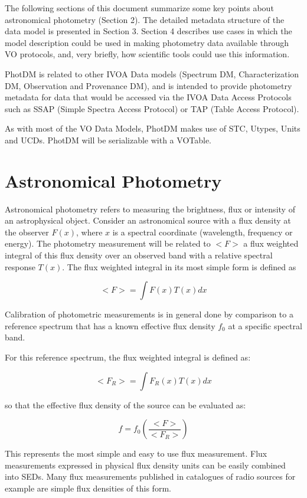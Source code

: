 \documentclass[11pt,a4paper]{ivoa}
\begin{document}
The following sections of this document summarize some key points about astronomical photometry (Section 2). The detailed metadata structure of the data model is presented in Section 3. Section 4 describes use cases in which the model description could be used in making photometry data available through VO protocols, and, very briefly, how scientific tools could use this information.


PhotDM is related to other IVOA Data models (Spectrum DM, Characterization DM, Observation and Provenance DM),  and is intended to provide photometry metadata for data that would be accessed via the IVOA Data Access Protocols such as SSAP (Simple Spectra Access Protocol) or TAP (Table Access Protocol).

As with most of the VO Data Models, PhotDM makes use of STC, Utypes, Units and UCDs. PhotDM will be serializable with a VOTable.

\section{Astronomical Photometry}
Astronomical photometry refers to measuring the brightness, flux or intensity of an astrophysical object. Consider an astronomical source with a flux density at the observer $F(x)$, where $x$ is a spectral coordinate (wavelength, frequency or energy).  The photometry measurement will be related to $<F>$ a flux weighted integral of this flux density over an observed band with a relative spectral response $T(x)$. The flux weighted integral in its most simple form is defined as


\[ <F> = \int F(x)T(x)dx \]

Calibration of photometric measurements is in general done by comparison to a reference spectrum that has a known effective flux density $f_0$ at a specific spectral band.


For this reference spectrum, the flux weighted integral is defined as:
\par
\[ <F_R > = \int F_R (x)T(x)dx \]

so that the effective flux density of the source can be evaluated as:\par

\[  f = f_0 ( \frac{<F>}{<F_R >} ) \]

This represents the most simple and easy to use flux measurement. Flux measurements expressed in physical flux density units can be easily combined into SEDs. Many flux measurements published in catalogues of radio sources for example are simple flux densities of this form.
\par
\end{document}
